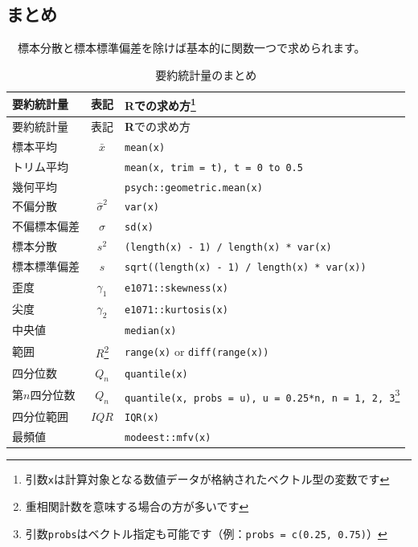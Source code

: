 \documentclass[
  12pt,
]{book}
\begin{document}
\newpage

\hypertarget{ux307eux3068ux3081-1}{%
\subsection{まとめ}\label{ux307eux3068ux3081-1}}

　標本分散と標本標準偏差を除けば基本的に関数一つで求められます。

\begin{longtable}[]{@{}lcl@{}}
\caption{要約統計量のまとめ}\tabularnewline
\toprule
要約統計量 & 表記 & \textbf{R}での求め方\footnote{引数\texttt{x}は計算対象となる数値データが格納されたベクトル型の変数です} \\
\midrule
\endfirsthead
\toprule
要約統計量 & 表記 & \textbf{R}での求め方{} \\
\midrule
\endhead
標本平均 & \(\bar{x}\) & \texttt{mean(x)} \\
トリム平均 & & \texttt{mean(x,\ trim\ =\ t),\ t\ =\ 0\ to\ 0.5} \\
幾何平均 & & \texttt{psych::geometric.mean(x)} \\
不偏分散 & \(\hat{\sigma}^2\) & \texttt{var(x)} \\
不偏標本偏差 & \(\hat{\sigma}\) & \texttt{sd(x)} \\
標本分散 & \(s^2\) & \texttt{(length(x)\ -\ 1)\ /\ length(x)\ *\ var(x)} \\
標本標準偏差 & \(s\) & \texttt{sqrt((length(x)\ -\ 1)\ /\ length(x)\ *\ var(x))} \\
歪度 & \(\gamma_1\) & \texttt{e1071::skewness(x)} \\
尖度 & \(\gamma_2\) & \texttt{e1071::kurtosis(x)} \\
中央値 & & \texttt{median(x)} \\
範囲 & \(R\)\footnote{重相関計数を意味する場合の方が多いです} & \texttt{range(x)} or \texttt{diff(range(x))} \\
四分位数 & \(Q_n\) & \texttt{quantile(x)} \\
第\(n\)四分位数 & \(Q_n\) & \texttt{quantile(x,\ probs\ =\ u),\ u\ =\ 0.25*n,\ n\ =\ 1,\ 2,\ 3}\footnote{引数\texttt{probs}はベクトル指定も可能です（例：\texttt{probs\ =\ c(0.25,\ 0.75)}）} \\
四分位範囲 & \(IQR\) & \texttt{IQR(x)} \\
最頻値 & & \texttt{modeest::mfv(x)} \\
\bottomrule
\end{longtable}

\newpage
\end{document}

